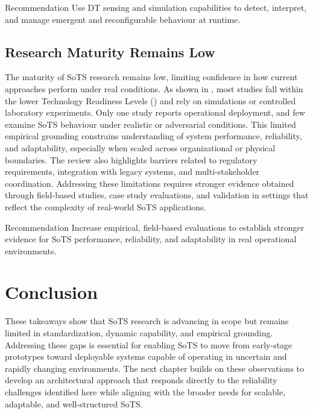\begin{recoframe}{Recommendation}
Use DT sensing and simulation capabilities to detect, interpret, and manage emergent and reconfigurable behaviour at runtime.
\end{recoframe}


\subsection*{Research Maturity Remains Low}

The maturity of SoTS research remains low, limiting confidence in how current approaches perform under real conditions. As shown in , most studies fall within the lower Technology Readiness Levels () and rely on simulations or controlled laboratory experiments. Only one study reports operational deployment, and few examine SoTS behaviour under realistic or adversarial conditions. This limited empirical grounding constrains understanding of system performance, reliability, and adaptability, especially when scaled across organizational or physical boundaries. The review also highlights barriers related to regulatory requirements, integration with legacy systems, and multi-stakeholder coordination. Addressing these limitations requires stronger evidence obtained through field-based studies, case study evaluations, and validation in settings that reflect the complexity of real-world SoTS applications.

\begin{recoframe}{Recommendation}
Increase empirical, field-based evaluations to establish stronger evidence for SoTS performance, reliability, and adaptability in real operational environments.
\end{recoframe}




\section{Conclusion}
These takeaways show that SoTS research is advancing in scope but remains limited in standardization, dynamic capability, and empirical grounding. Addressing these gaps is essential for enabling SoTS to move from early-stage prototypes toward deployable systems capable of operating in uncertain and rapidly changing environments. The next chapter builds on these observations to develop an architectural approach that responds directly to the reliability challenges identified here while aligning with the broader needs for scalable, adaptable, and well-structured SoTS.
